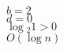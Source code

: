 \documentclass{article}
\begin{document}
                                                                                                                                                                                                                                                                                                                                                                                                                                                                                                                                                                                                                                                                                                                                        $b=2$\\
                                                                                                                                                                                                                                                                                                                                                                                                                                                                                                                                                                                                                                                                                                                                                $d=0$\\
                                                                                                                                                                                                                                                                                                                                                                                                                                                                                                                                                                                                                                                                                                                                                        $\log{_2}{1} > 0$\\
                                                                                                                                                                                                                                                                                                                                                                                                                                                                                                                                                                                                                                                                                                                                                                $O(\log{n})$ \\
\end{document}
